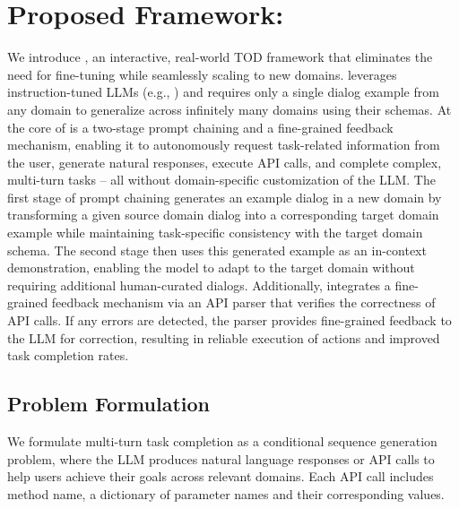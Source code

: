 \section{Proposed Framework: {\ours}}
\label{sec:realtod}

We introduce {\ours}, an interactive, real-world TOD framework that eliminates the need for fine-tuning while seamlessly scaling to new domains. {\ours} leverages instruction-tuned LLMs (e.g., \LlamaShortName) and requires only a single dialog example from any domain to generalize across infinitely many domains using their schemas.
At the core of {\ours} is a two-stage prompt chaining and a fine-grained feedback mechanism, enabling it to autonomously request task-related information from the user, generate natural responses, execute API calls, and complete complex, multi-turn tasks -- all without domain-specific customization of the LLM. The first stage of prompt chaining generates an example dialog in a new domain by transforming a given source domain dialog into a corresponding target domain example while maintaining task-specific consistency with the target domain schema. The second stage then uses this generated example as an in-context demonstration, enabling the model to adapt to the target domain without requiring additional human-curated dialogs.
Additionally, {\ours} integrates a fine-grained feedback mechanism via an API parser that verifies the correctness of API calls. If any errors are detected, the parser provides fine-grained feedback to the LLM for correction, resulting in reliable execution of actions and improved task completion rates.


\subsection{Problem Formulation} \label{sec:problem_formulation} 

We formulate multi-turn task completion as a conditional sequence generation problem, where the LLM produces natural language responses or API calls to help users achieve their goals across relevant domains. 
Each API call includes method name, a dictionary of parameter names and their corresponding values.


